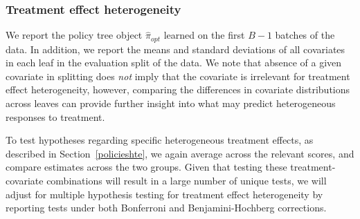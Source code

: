 \documentclass[letterpaper, 12pt, parskip=full,DIV=10]{scrartcl}
\begin{document}
\subsubsection{Treatment effect heterogeneity}
We report the policy tree object $\hat{\pi}_{opt}$ learned on the first $B-1$ batches of the data. In addition, we report the means and standard deviations of all covariates in each leaf in the evaluation split of the data. We note that absence of a given covariate in splitting does \textit{not} imply that the covariate is irrelevant for treatment effect heterogeneity, however, comparing the differences in covariate distributions across leaves can provide further insight into what may predict heterogeneous responses to treatment. 

To test hypotheses regarding specific heterogeneous treatment effects, as described in Section~\ref{policieshte}, we again average across the relevant scores, and compare estimates across the two groups. Given that testing these treatment-covariate combinations will result in a large number of unique tests, we will adjust for multiple hypothesis testing for treatment effect heterogeneity by reporting tests under both Bonferroni and Benjamini-Hochberg corrections.
\end{document}
